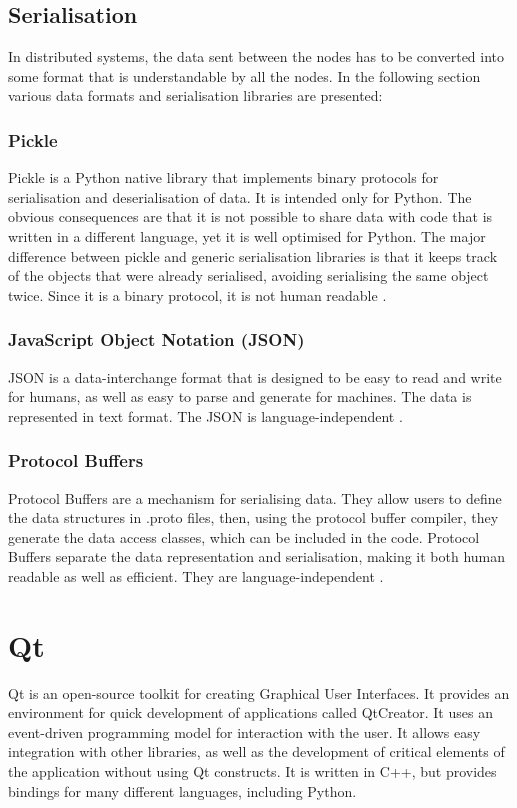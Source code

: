     
    \subsection{Serialisation} \label{subsec:serialisation}
        In distributed systems, the data sent between the nodes has to be converted into some format that is understandable by all the nodes. In the following section various data formats and serialisation libraries are presented: 
        
        \subsubsection{Pickle}
            Pickle is a Python native library that implements binary protocols for serialisation and deserialisation of data. It is intended only for Python. The obvious consequences are that it is not possible to share data with code that is written in a different language, yet it is well optimised for Python. The major difference between pickle and generic serialisation libraries is that it keeps track of the objects that were already serialised, avoiding serialising the same object twice. Since it is a binary protocol, it is not human readable \cite{pickle}.
        
        \subsubsection{JavaScript Object Notation (JSON)}
            JSON is a data-interchange format that is designed to be easy to read and write for humans, as well as easy to parse and generate for machines. The data is represented in text format. The JSON is language-independent \cite{json}.
        
        \subsubsection{Protocol Buffers}
            Protocol Buffers are a mechanism for serialising data. They allow users to define the data structures in .proto files, then, using the protocol buffer compiler, they generate the data access classes, which can be included in the code. Protocol Buffers separate the data representation and serialisation, making it both human readable as well as efficient. They are language-independent \cite{protobuf}.

\section{Qt} \label{section:qt}
    Qt is an open-source toolkit for creating Graphical User Interfaces. It provides an environment for quick development of applications called QtCreator. It uses an event-driven programming model for interaction with the user. It allows easy integration with other libraries, as well as the development of critical elements of the application without using Qt constructs. It is written in C++, but provides bindings for many different languages, including Python. 
